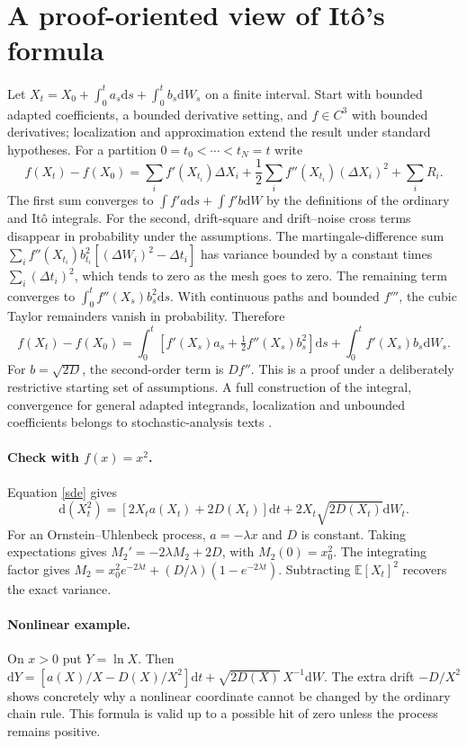 \documentclass[11pt,a4paper]{article}
\newcommand{\dd}{\mathrm d}
\newcommand{\E}{\mathbb E}
\theoremstyle{remark}\newtheorem*{remark}{Physical interpretation}
\begin{document}
\section{A proof-oriented view of It\^o's formula}
Let $X_t=X_0+\int_0^t a_s\dd s+\int_0^t b_s\dd W_s$ on a finite interval. Start with bounded adapted coefficients, a bounded derivative setting, and $f\in C^3$ with bounded derivatives; localization and approximation extend the result under standard hypotheses. For a partition $0=t_0<\cdots<t_N=t$ write
\begin{equation}
f(X_t)-f(X_0)=\sum_i f'(X_{t_i})\Delta X_i+\frac12\sum_i f''(X_{t_i})(\Delta X_i)^2+\sum_i R_i.
\end{equation}
The first sum converges to $\int f'a\dd s+\int f'b\dd W$ by the definitions of the ordinary and It\^o integrals. For the second, drift-square and drift--noise cross terms disappear in probability under the assumptions. The martingale-difference sum $\sum_i f''(X_{t_i})b_{t_i}^2[(\Delta W_i)^2-\Delta t_i]$ has variance bounded by a constant times $\sum_i(\Delta t_i)^2$, which tends to zero as the mesh goes to zero. The remaining term converges to $\int_0^t f''(X_s)b_s^2\dd s$. With continuous paths and bounded $f'''$, the cubic Taylor remainders vanish in probability. Therefore
\begin{equation}
f(X_t)-f(X_0)=\int_0^t\left[f'(X_s)a_s+\tfrac12 f''(X_s)b_s^2\right]\dd s+\int_0^t f'(X_s)b_s\dd W_s.
\end{equation}
For $b=\sqrt{2D}$, the second-order term is $Df''$. This is a proof under a deliberately restrictive starting set of assumptions. A full construction of the integral, convergence for general adapted integrands, localization and unbounded coefficients belongs to stochastic-analysis texts \cite{gardiner}.

\paragraph{Check with $f(x)=x^2$.} Equation \eqref{sde} gives
\begin{equation}\dd(X_t^2)=[2X_ta(X_t)+2D(X_t)]\dd t+2X_t\sqrt{2D(X_t)}\dd W_t.\end{equation} For an Ornstein--Uhlenbeck process, $a=-\lambda x$ and $D$ is constant. Taking expectations gives $M_2'=-2\lambda M_2+2D$, with $M_2(0)=x_0^2$. The integrating factor gives $M_2=x_0^2e^{-2\lambda t}+(D/\lambda)(1-e^{-2\lambda t})$. Subtracting $\E[X_t]^2$ recovers the exact variance.

\paragraph{Nonlinear example.} On $x>0$ put $Y=\ln X$. Then $\dd Y=[a(X)/X-D(X)/X^2]\dd t+\sqrt{2D(X)}\,X^{-1}\dd W$. The extra drift $-D/X^2$ shows concretely why a nonlinear coordinate cannot be changed by the ordinary chain rule. This formula is valid up to a possible hit of zero unless the process remains positive.
\end{document}
